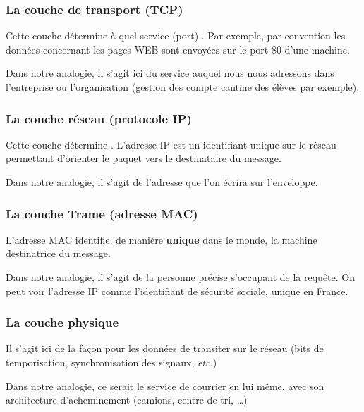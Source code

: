 \documentclass[10pt,fleqn]{article} %
\begin{document}
\subsubsection{La couche de transport (TCP)}
Cette couche détermine à quel service (port) . Par exemple, par convention les données concernant les pages WEB sont envoyées sur le port 80 d'une machine.

\begin{remark}
  Dans notre analogie, il s'agit ici du service auquel nous nous adressons dans l'entreprise ou l'organisation (gestion des compte cantine des élèves par exemple).
\end{remark}

\subsubsection{La couche réseau (protocole IP)}
Cette couche détermine . L'adresse IP est un identifiant unique sur le réseau permettant d'orienter le paquet vers le destinataire du message.

\begin{remark}
  Dans notre analogie, il s'agit de l'adresse que l'on écrira sur l'enveloppe.
\end{remark}

\subsubsection{La couche Trame (adresse MAC)}
L'adresse MAC identifie, de manière \textbf{unique} dans le monde, la machine destinatrice du message.

\begin{remark}
  Dans notre analogie, il s'agit de la personne précise s'occupant de la requête. On peut voir l'adresse IP comme l'identifiant de sécurité sociale, unique en France.
\end{remark}

\subsubsection{La couche physique}
Il s'agit ici de la façon pour les données de transiter sur le réseau (bits de temporisation, synchronisation des signaux, \textit{etc.})

\begin{remark}
  Dans notre analogie, ce serait le service de courrier en lui même, avec son architecture d'acheminement (camions, centre de tri, \dots)
\end{remark}
\end{document}
